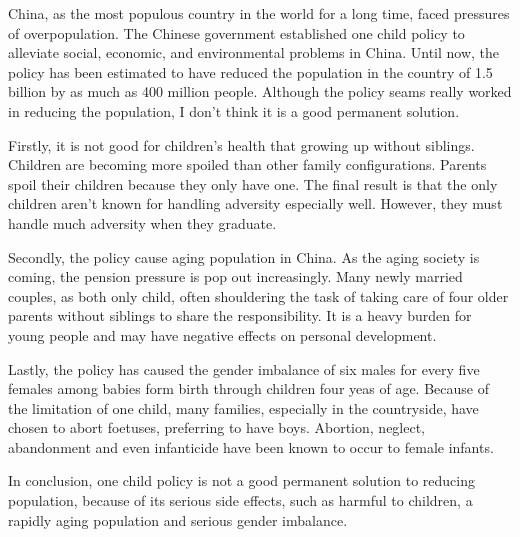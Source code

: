 \documentclass[12pt,a4paper]{caspset}
\begin{document}

China, as the most populous country in the world for a long time, faced pressures of overpopulation. The Chinese government established one child policy to  alleviate social, economic, and environmental problems in China. Until now, the policy has been estimated to have reduced the population in the country of 1.5 billion by as much as 400 million people. Although the policy seams really worked in reducing the population, I don't think it is a good permanent solution. 

Firstly, it is not good for children's health that growing up without siblings. Children are becoming more spoiled than other family configurations. Parents spoil their children because they only have one.  The final result is that the only children aren’t known for handling adversity especially well. However, they must handle much adversity when they graduate.

Secondly, the policy cause aging population  in China. As the aging society is coming, the pension pressure is pop out increasingly. Many newly married couples, as both only child, often shouldering the task of taking care of four older parents without siblings to share the responsibility. It is a heavy burden for young people and may have negative effects on personal development. 

Lastly, the policy has caused the gender imbalance of six males for every five females among babies form birth through children four yeas of age. Because of the limitation of one child, many families, especially in the countryside, have chosen to abort foetuses, preferring to have boys. Abortion, neglect, abandonment and even infanticide have been known to occur to female infants.

In conclusion, one child policy is not a good permanent solution to reducing population, because of its serious side effects, such as harmful to children, a rapidly aging population and serious gender imbalance.
\end{document}
